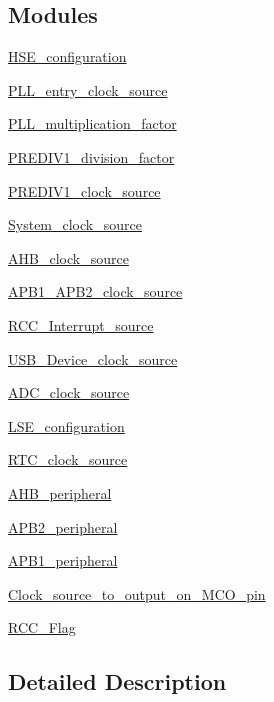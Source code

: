 \subsection*{Modules}
\begin{DoxyCompactItemize}
\item 
\hyperlink{group___h_s_e__configuration}{H\+S\+E\+\_\+configuration}
\item 
\hyperlink{group___p_l_l__entry__clock__source}{P\+L\+L\+\_\+entry\+\_\+clock\+\_\+source}
\item 
\hyperlink{group___p_l_l__multiplication__factor}{P\+L\+L\+\_\+multiplication\+\_\+factor}
\item 
\hyperlink{group___p_r_e_d_i_v1__division__factor}{P\+R\+E\+D\+I\+V1\+\_\+division\+\_\+factor}
\item 
\hyperlink{group___p_r_e_d_i_v1__clock__source}{P\+R\+E\+D\+I\+V1\+\_\+clock\+\_\+source}
\item 
\hyperlink{group___system__clock__source}{System\+\_\+clock\+\_\+source}
\item 
\hyperlink{group___a_h_b__clock__source}{A\+H\+B\+\_\+clock\+\_\+source}
\item 
\hyperlink{group___a_p_b1___a_p_b2__clock__source}{A\+P\+B1\+\_\+\+A\+P\+B2\+\_\+clock\+\_\+source}
\item 
\hyperlink{group___r_c_c___interrupt__source}{R\+C\+C\+\_\+\+Interrupt\+\_\+source}
\item 
\hyperlink{group___u_s_b___device__clock__source}{U\+S\+B\+\_\+\+Device\+\_\+clock\+\_\+source}
\item 
\hyperlink{group___a_d_c__clock__source}{A\+D\+C\+\_\+clock\+\_\+source}
\item 
\hyperlink{group___l_s_e__configuration}{L\+S\+E\+\_\+configuration}
\item 
\hyperlink{group___r_t_c__clock__source}{R\+T\+C\+\_\+clock\+\_\+source}
\item 
\hyperlink{group___a_h_b__peripheral}{A\+H\+B\+\_\+peripheral}
\item 
\hyperlink{group___a_p_b2__peripheral}{A\+P\+B2\+\_\+peripheral}
\item 
\hyperlink{group___a_p_b1__peripheral}{A\+P\+B1\+\_\+peripheral}
\item 
\hyperlink{group___clock__source__to__output__on___m_c_o__pin}{Clock\+\_\+source\+\_\+to\+\_\+output\+\_\+on\+\_\+\+M\+C\+O\+\_\+pin}
\item 
\hyperlink{group___r_c_c___flag}{R\+C\+C\+\_\+\+Flag}
\end{DoxyCompactItemize}


\subsection{Detailed Description}
